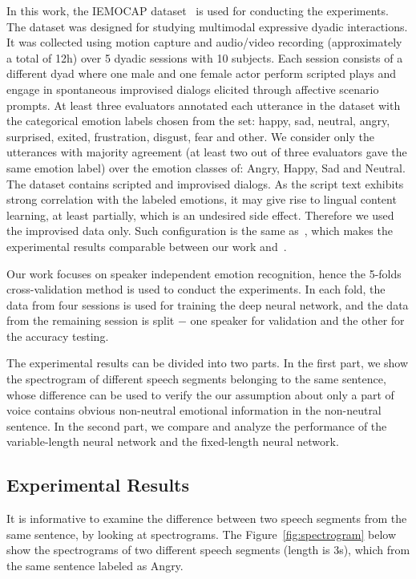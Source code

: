 \documentclass[a4paper]{article}
\begin{document}
In this work, the IEMOCAP dataset~\cite{busso2008} is used for conducting the experiments. The dataset was designed for studying multimodal expressive dyadic interactions. It was collected using motion capture and audio/video recording (approximately a total of 12h) over 5 dyadic sessions with 10 subjects. Each session consists of a different dyad where one male and one female actor perform scripted plays and engage in spontaneous improvised dialogs elicited through affective scenario prompts. At least three evaluators annotated each utterance in the dataset with the categorical emotion labels chosen from the set: happy, sad, neutral, angry, surprised, exited, frustration, disgust, fear and other. We consider only the utterances with majority agreement (at least two out of three evaluators gave the same emotion label) over the emotion classes of: Angry, Happy, Sad and Neutral. The dataset contains scripted and improvised dialogs. As the script text exhibits strong correlation with the labeled emotions, it may give rise to lingual content learning, at least partially, which is an undesired side effect. Therefore we used the improvised data only. Such configuration is the same as~\cite{satt2017}, which makes the experimental results comparable between our work and~\cite{satt2017}.

Our work focuses on speaker independent emotion recognition, hence the 5-folds cross-validation method is used to conduct the experiments. In each fold, the data from four sessions is used for training the deep neural network, and the data from the remaining session is split $-$ one speaker for validation and the other for the accuracy testing.

The experimental results can be divided into two parts. In the first part, we show the spectrogram of different speech segments belonging to the same sentence, whose difference can be used to verify the our assumption about only a part of voice contains obvious non-neutral emotional information in the non-neutral sentence. In the second part, we compare and analyze the performance of the variable-length neural network and the fixed-length neural network.

\subsection{Experimental Results}
\label{ssec:experimental results}

It is informative to examine the difference between two speech segments from the same sentence, by looking at spectrograms. The Figure~\ref{fig:spectrogram} below show the spectrograms of two different speech segments (length is 3s), which from the same sentence labeled as Angry.
\end{document}
